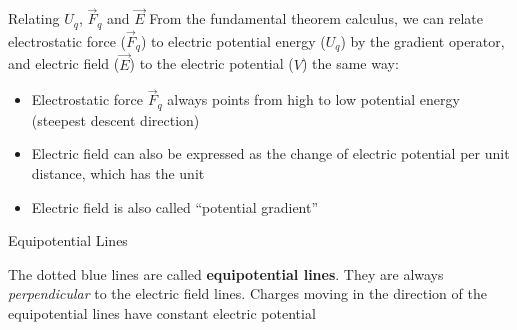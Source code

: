 \documentclass[12pt,aspectratio=169]{beamer}
\begin{document}
\begin{frame}{Relating $U_q$, $\vec F_q$ and $\vec E$}
  From the fundamental theorem calculus, we can relate electrostatic force
  ($\vec F_q$) to electric potential energy ($U_q$) by the gradient operator,
  and electric field ($\vec E$) to the electric potential ($V$) the same way:

  \begin{itemize}  
  \item Electrostatic force $\vec F_q$ always points from high to low potential
    energy (steepest descent direction)
  \item Electric field can also be expressed as the change of electric
    potential per unit distance, which has the unit
    
  \item Electric field is also called ``potential gradient''
  \end{itemize}
\end{frame}




\begin{frame}{Equipotential Lines}
  \begin{center}
  \end{center}
  The dotted blue lines are called \textbf{equipotential lines}. They are
  always \emph{perpendicular} to the electric field lines. Charges moving in
  the direction of the equipotential lines have constant electric potential
\end{frame}
\end{document}
